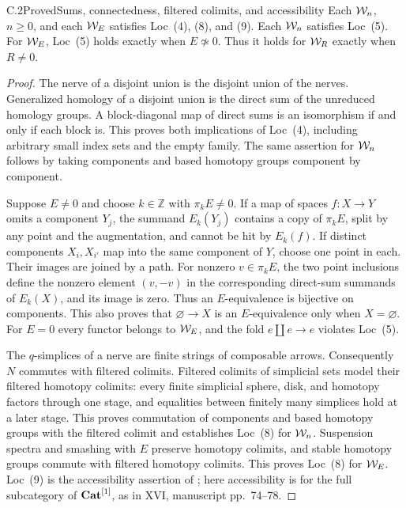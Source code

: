 \begin{claim}{C.2}{Proved}{Sums, connectedness, filtered colimits, and accessibility}
Each $\mathcal{W}_n$, $n\geq0$, and each $\mathcal{W}_E$ satisfies Loc~(4), (8), and (9).
Each $\mathcal{W}_n$ satisfies Loc~(5). For $\mathcal{W}_E$, Loc~(5) holds exactly when
$E\not\simeq0$. Thus it holds for $\mathcal{W}_R$ exactly when $R\neq0$.
\end{claim}
\begin{proof}
The nerve of a disjoint union is the disjoint union of the nerves.
Generalized homology of a disjoint union is the direct sum of the
unreduced homology groups. A block-diagonal map of direct sums is an
isomorphism if and only if each block is. This proves both implications
of Loc~(4), including arbitrary small index sets and the empty family.
The same assertion for $\mathcal{W}_n$ follows by taking components and based
homotopy groups component by component.

Suppose $E\neq0$ and choose $k\in\mathbb Z$ with $\pi_kE\neq0$.
If a map of spaces $f:X\to Y$ omits a component $Y_j$, the summand
$E_k(Y_j)$ contains a copy of $\pi_kE$, split by any point and the
augmentation, and cannot be hit by $E_k(f)$. If distinct components
$X_i,X_{i'}$ map into the same component of $Y$, choose one point in
each. Their images are joined by a path. For nonzero $v\in\pi_kE$,
the two point inclusions define the nonzero element $(v,-v)$ in the
corresponding direct-sum summands of $E_k(X)$, and its image is zero.
Thus an $E$-equivalence is bijective on components. This also proves
that $\varnothing\to X$ is an $E$-equivalence only when $X=\varnothing$.
For $E=0$ every functor belongs to $\mathcal{W}_E$, and the fold $e\amalg e\to e$
violates Loc~(5).

The $q$-simplices of a nerve are finite strings of composable arrows.
Consequently $N$ commutes with filtered colimits. Filtered colimits of
simplicial sets model their filtered homotopy colimits: every finite
simplicial sphere, disk, and homotopy factors through one stage, and
equalities between finitely many simplices hold at a later stage.
This proves commutation of components and based homotopy groups with
the filtered colimit and establishes Loc~(8) for $\mathcal{W}_n$. Suspension
spectra and smashing with $E$ preserve homotopy colimits, and stable
homotopy groups commute with filtered homotopy colimits. This proves
Loc~(8) for $\mathcal{W}_E$. Loc~(9) is the accessibility assertion of
; here accessibility is for the full subcategory of
$\mathbf{Cat}^{[1]}$, as in XVI, manuscript pp.~74--78.
\end{proof}

